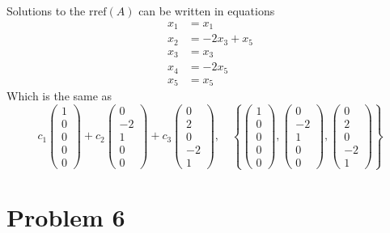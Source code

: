 \documentclass{article}
\begin{document}
Solutions to the $ \mathrm{rref} (A) $ can be written in equations
\begin{align*}
    x_1 &= x_1 \\
    x_2 &= -2 x_3 + x_5 \\
    x_3 &= x_3 \\
    x_4 &= -2 x_5 \\
    x_5 &= x_5
\end{align*}
Which is the same as
$$ c_1 \begin{pmatrix}
    1 \\
    0 \\
    0 \\
    0 \\
    0
\end{pmatrix}
+ c_2 \begin{pmatrix}
    0 \\
    -2 \\
    1 \\
    0 \\
    0
\end{pmatrix}
+ c_3 \begin{pmatrix}
    0 \\
    2 \\
    0 \\
    -2 \\
    1
\end{pmatrix}
,\quad
\left\{
    \begin{pmatrix}
        1 \\
        0 \\
        0 \\
        0 \\
        0
    \end{pmatrix},
    \begin{pmatrix}
        0 \\
        -2 \\
        1 \\
        0 \\
        0
    \end{pmatrix},
    \begin{pmatrix}
        0 \\
        2 \\
        0 \\
        -2 \\
        1
    \end{pmatrix}
\right\} $$

\section*{Problem 6}
\end{document}
